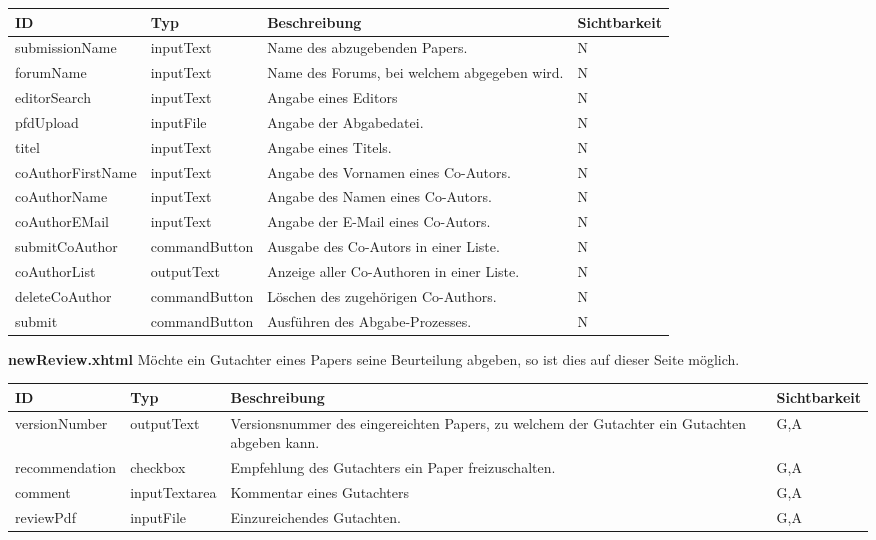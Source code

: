 \begin{tabular}[H]{|m{2cm}|m{3cm}|m{6cm}|m{2.5cm}|}
    \hline
    \textbf{ID} & \textbf{Typ} & \textbf{Beschreibung} & \textbf{Sichtbarkeit} \\
    \hline
    \hline
    submissionName & inputText & Name des abzugebenden Papers. & N\\
    \hline
    forumName & inputText & Name des Forums, bei welchem abgegeben wird. & N \\
    \hline
    editorSearch & inputText & Angabe eines Editors & N\\
    \hline
    pfdUpload & inputFile & Angabe der Abgabedatei. & N\\
    \hline
    titel & inputText & Angabe eines Titels. & N\\
    \hline
    coAuthorFirstName & inputText & Angabe des Vornamen eines Co-Autors.& N\\
    \hline
    coAuthorName & inputText & Angabe des Namen eines Co-Autors. & N\\
    \hline
    coAuthorEMail & inputText & Angabe der E-Mail eines Co-Autors. & N\\
    \hline
    submitCoAuthor & commandButton & Ausgabe des Co-Autors in einer Liste. & N\\
    \hline
    coAuthorList & outputText & Anzeige aller Co-Authoren in einer Liste. & N\\
    \hline
    deleteCoAuthor & commandButton & Löschen des zugehörigen Co-Authors. & N\\
    \hline
    submit & commandButton & Ausführen des Abgabe-Prozesses. & N \\
    \hline
\end{tabular}

\textbf{newReview.xhtml} Möchte ein Gutachter eines Papers seine Beurteilung abgeben, so ist dies auf dieser Seite möglich.

\begin{tabular}{|m{2cm}|m{3cm}|m{6cm}|m{2.5cm}|}
    \hline
    \textbf{ID} & \textbf{Typ} & \textbf{Beschreibung} & \textbf{Sichtbarkeit} \\
    \hline
    \hline
    versionNumber & outputText & Versionsnummer des eingereichten Papers, zu welchem der Gutachter ein Gutachten abgeben kann. & G,A\\
    \hline
    recommendation & checkbox & Empfehlung des Gutachters ein Paper freizuschalten. & G,A\\
    \hline
    comment & inputTextarea & Kommentar eines Gutachters & G,A\\
    \hline
    reviewPdf & inputFile & Einzureichendes Gutachten. & G,A \\
    \hline
\end{tabular}



